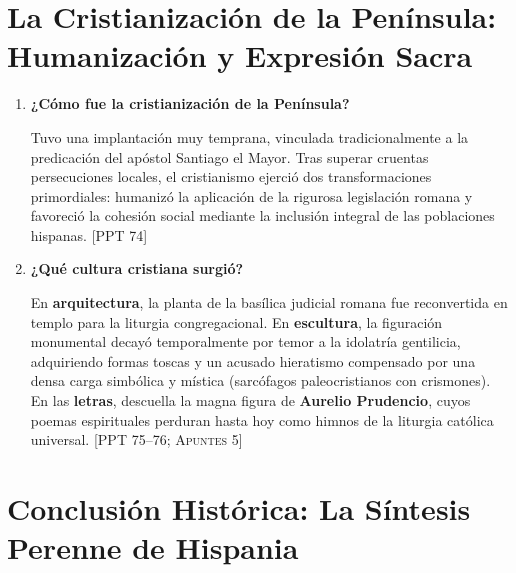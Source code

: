 \documentclass[11pt,letterpaper]{article}
\newcommand{\fuente}[1]{\nolinebreak\hfill{\footnotesize\color{black!55}\textsc{[#1]}}}
\newcommand{\preg}[1]{\item \textbf{#1}\par\nopagebreak\vspace{0.2em}}
\begin{document}
\section{La Cristianización de la Península: Humanización y Expresión Sacra}

\begin{enumerate}[resume]
  \preg{¿Cómo fue la cristianización de la Península?}
  Tuvo una implantación muy temprana, vinculada tradicionalmente a la predicación del apóstol Santiago el Mayor. Tras superar cruentas persecuciones locales, el cristianismo ejerció dos transformaciones primordiales: humanizó la aplicación de la rigurosa legislación romana y favoreció la cohesión social mediante la inclusión integral de las poblaciones hispanas. \fuente{PPT 74}

  \preg{¿Qué cultura cristiana surgió?}
  En \textbf{arquitectura}, la planta de la basílica judicial romana fue reconvertida en templo para la liturgia congregacional. En \textbf{escultura}, la figuración monumental decayó temporalmente por temor a la idolatría gentilicia, adquiriendo formas toscas y un acusado hieratismo compensado por una densa carga simbólica y mística (sarcófagos paleocristianos con crismones). En las \textbf{letras}, descuella la magna figura de \textbf{Aurelio Prudencio}, cuyos poemas espirituales perduran hasta hoy como himnos de la liturgia católica universal. \fuente{PPT 75--76; Apuntes 5}
\end{enumerate}

\section{Conclusión Histórica: La Síntesis Perenne de Hispania}
\end{document}
